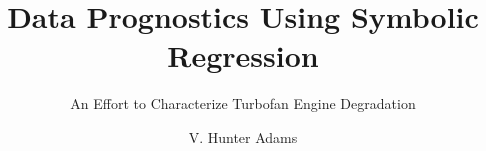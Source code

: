 \documentclass{acm_proc_article-sp}
\begin{document}
\title{Data Prognostics Using Symbolic Regression}
\subtitle{An Effort to Characterize Turbofan Engine Degradation}
%
%
%
%
%

%
\author{
%
%
\alignauthor
V. Hunter Adams\\
       \\
}

\end{document}
